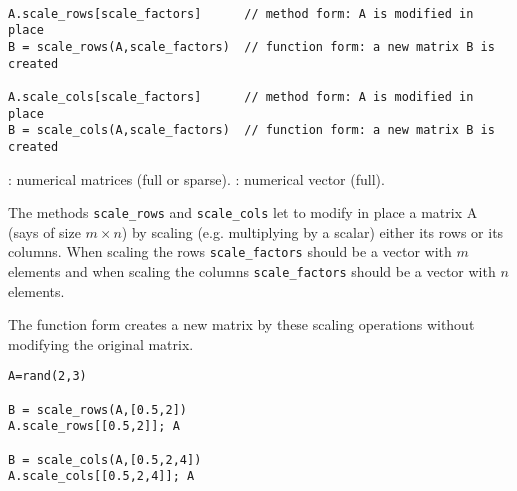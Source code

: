 \begin{mandesc}
  \\ 
\end{mandesc}
\begin{calling_sequence}
\begin{verbatim}
A.scale_rows[scale_factors]      // method form: A is modified in place
B = scale_rows(A,scale_factors)  // function form: a new matrix B is created

A.scale_cols[scale_factors]      // method form: A is modified in place
B = scale_cols(A,scale_factors)  // function form: a new matrix B is created
\end{verbatim}
\end{calling_sequence}
\begin{parameters}
  \begin{varlist}
    : numerical matrices (full or sparse).
    : numerical vector (full).
  \end{varlist}
\end{parameters}

\begin{mandescription}

The methods \verb+scale_rows+ and \verb+scale_cols+ let to modify in place a matrix A 
(says of size $m \times n$) by scaling (e.g. multiplying by a scalar) either its rows 
or its columns. When scaling the rows  \verb+scale_factors+ should be a vector with $m$ 
elements and when scaling the columns \verb+scale_factors+ should be a vector with 
$n$ elements.

The function form  creates a new matrix by these scaling operations without modifying 
the original matrix.
\end{mandescription}


\begin{examples}
\begin{Verbatim}
A=rand(2,3)

B = scale_rows(A,[0.5,2])
A.scale_rows[[0.5,2]]; A

B = scale_cols(A,[0.5,2,4])
A.scale_cols[[0.5,2,4]]; A
\end{Verbatim}

\end{examples}

\begin{manseealso}
\end{manseealso}

